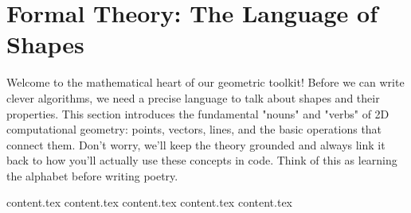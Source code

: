 \clearpage
\section{Formal Theory: The Language of Shapes}
\label{sec:A.1}

Welcome to the mathematical heart of our geometric toolkit! Before we can write clever algorithms, we need a precise language to talk about shapes and their properties. This section introduces the fundamental "nouns" and "verbs" of 2D computational geometry: points, vectors, lines, and the basic operations that connect them. Don't worry, we'll keep the theory grounded and always link it back to how you'll actually use these concepts in code. Think of this as learning the alphabet before writing poetry.

{content.tex}
{content.tex}
{content.tex}
{content.tex}
{content.tex}